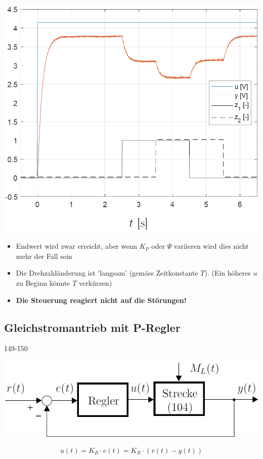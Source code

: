 \begin{minipage}[c]{0.4\columnwidth}
    \includegraphics[width=\columnwidth]{images/gleichstromantrieb_steuerung_step-response.png}
\end{minipage}
\hfill
\begin{minipage}[c]{0.48\columnwidth}
    \begin{itemize}
        \item Endwert wird zwar erreicht, aber wenn $K_P$ oder $\Psi$ variieren wird dies nicht mehr der Fall sein
        \item Die Drehzahländerung ist 'langsam' (gemäss Zeitkonstante $T$). (Ein höheres $u$ zu Beginn könnte $T$ verkürzen)
        \item \textbf{Die Steuerung reagiert nicht auf die Störungen!}
    \end{itemize}
\end{minipage}


\subsection{Gleichstromantrieb mit P-Regler}{149-150}
\label{P-Regler}

\begin{minipage}[c]{0.4\columnwidth}
    \includegraphics[width=\columnwidth]{images/gleichstromantrieb_p-regler.png}
\end{minipage}
\hfill
\begin{minipage}[c]{0.48\columnwidth}
    $$ u(t) = K_R \cdot e(t) = K_R \cdot ( r(t) - y(t) )$$
\end{minipage}

